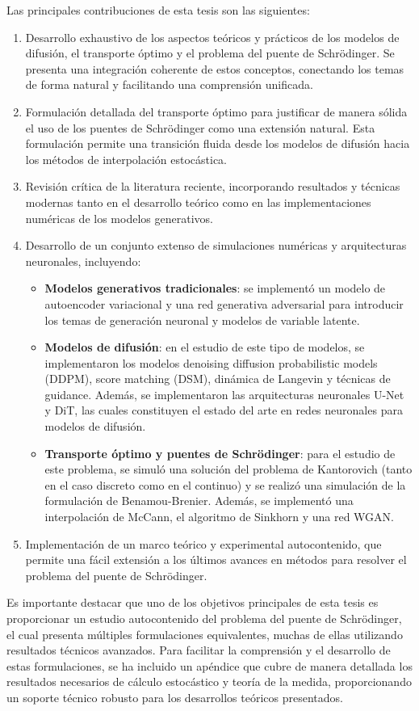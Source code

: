 Las principales contribuciones de esta tesis son las siguientes:
\begin{enumerate}
    \item Desarrollo exhaustivo de los aspectos teóricos y prácticos de los modelos de difusión, el transporte óptimo y el problema del puente de Schrödinger. Se presenta una integración coherente de estos conceptos, conectando los temas de forma natural y facilitando una comprensión unificada.
    \item Formulación detallada del transporte óptimo para justificar de manera sólida el uso de los puentes de Schrödinger como una extensión natural. Esta formulación permite una transición fluida desde los modelos de difusión hacia los métodos de interpolación estocástica.
    \item Revisión crítica de la literatura reciente, incorporando resultados y técnicas modernas tanto en el desarrollo teórico como en las implementaciones numéricas de los modelos generativos.
    \item Desarrollo de un conjunto extenso de simulaciones numéricas y arquitecturas neuronales, incluyendo:
          \begin{itemize}
              \item \textbf{Modelos generativos tradicionales}: se implementó un modelo de autoencoder variacional y una red generativa adversarial para introducir los temas de generación neuronal y modelos de variable latente.
              \item \textbf{Modelos de difusión}: en el estudio de este tipo de modelos, se implementaron los modelos denoising diffusion probabilistic models (DDPM), score matching (DSM), dinámica de Langevin y técnicas de guidance. Además, se implementaron las arquitecturas neuronales U-Net y DiT, las cuales constituyen el estado del arte en redes neuronales para modelos de difusión.
              \item \textbf{Transporte óptimo y puentes de Schrödinger}: para el estudio de este problema, se simuló una solución del problema de Kantorovich (tanto en el caso discreto como en el continuo) y se realizó una simulación de la formulación de Benamou-Brenier. Además, se implementó una interpolación de McCann, el algoritmo de Sinkhorn y una red WGAN.
          \end{itemize}
    \item Implementación de un marco teórico y experimental autocontenido, que permite una fácil extensión a los últimos avances en métodos para resolver el problema del puente de Schrödinger.
\end{enumerate}

Es importante destacar que uno de los objetivos principales de esta tesis es proporcionar un estudio autocontenido del problema del puente de Schrödinger, el cual presenta múltiples formulaciones equivalentes, muchas de ellas utilizando resultados técnicos avanzados. Para facilitar la comprensión y el desarrollo de estas formulaciones, se ha incluido un apéndice que cubre de manera detallada los resultados necesarios de cálculo estocástico y teoría de la medida, proporcionando un soporte técnico robusto para los desarrollos teóricos presentados.
